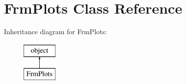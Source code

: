 \hypertarget{class_f_plots_1_1_frm_plots}{}\section{Frm\+Plots Class Reference}
\label{class_f_plots_1_1_frm_plots}
Inheritance diagram for Frm\+Plots\+:\begin{figure}[H]
\begin{center}
\leavevmode
\includegraphics[height=2.000000cm]{class_f_plots_1_1_frm_plots}
\end{center}
\end{figure}
